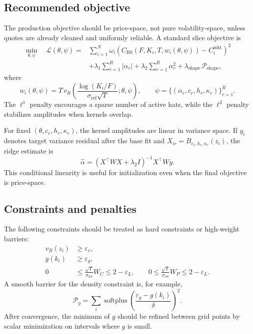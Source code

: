 \documentclass[11pt]{article}
\newcommand{\eps}{\varepsilon}
\newcommand{\sigref}{\sigma_{\mathrm{ref}}}
\newcommand{\softplus}{\operatorname{softplus}}
\begin{document}
\subsection{Recommended objective}

The production objective should be price-space, not pure volatility-space, unless quotes are already cleaned and uniformly reliable.  A standard slice objective is
\begin{align}
  \min_{\theta,\psi}
  \quad
  \mathcal{L}(\theta,\psi)
  ={}&\sum_{i=1}^{N}\omega_i
  \left(
    C_{\mathrm{BS}}(F,K_i,T,w_i(\theta,\psi))-C_i^{\mathrm{mkt}}
  \right)^2
  \nonumber\\
  &+\lambda_1\sum_{r=1}^{R}|\alpha_r|
  +\lambda_2\sum_{r=1}^{R}\alpha_r^2
  +\lambda_{\mathrm{shape}}\,\mathcal{P}_{\mathrm{shape}},
  \label{eq:calibration-objective}
\end{align}
where
\begin{equation}
  w_i(\theta,\psi)=T\,v_R\!\left(\frac{\log(K_i/F)}{\sigref\sqrt{T}};\theta,\psi\right),
  \qquad
  \psi=\{(\alpha_r,c_r,h_r,\kappa_r)\}_{r=1}^{R}.
\end{equation}
The $\ell^1$ penalty encourages a sparse number of active hats, while the $\ell^2$ penalty stabilizes amplitudes when kernels overlap.

For fixed $(\theta,c_r,h_r,\kappa_r)$, the kernel amplitudes are linear in variance space.  If $y_i$ denotes target variance residual after the base fit and $X_{ir}=B_{c_r,h_r,\kappa_r}(z_i)$, the ridge estimate is
\begin{equation}
  \widehat{\alpha}
  =(X^\top W X+\lambda_2 I)^{-1}X^\top W y.
  \label{eq:linear-amplitude-fit}
\end{equation}
This conditional linearity is useful for initialization even when the final objective is price-space.

\subsection{Constraints and penalties}

The following constraints should be treated as hard constraints or high-weight barriers:
\begin{align}
  v_R(z_i)&\ge \eps_v,
  \label{eq:v-positive-grid}\\
  g(k_i)&\ge \eps_g,
  \label{eq:g-positive-grid}\\
  0&\le \frac{\sqrt{T}}{\sigref}W_C\le2-\eps_L,
  \qquad
  0\le \frac{\sqrt{T}}{\sigref}W_P\le2-\eps_L.
  \label{eq:lee-grid}
\end{align}
A smooth barrier for the density constraint is, for example,
\begin{equation}
  \mathcal{P}_{g}
  =\sum_i \softplus\!\left(\frac{\eps_g-g(k_i)}{\delta}\right)^2.
  \label{eq:g-barrier}
\end{equation}
After convergence, the minimum of $g$ should be refined between grid points by scalar minimization on intervals where $g$ is small.
\end{document}
